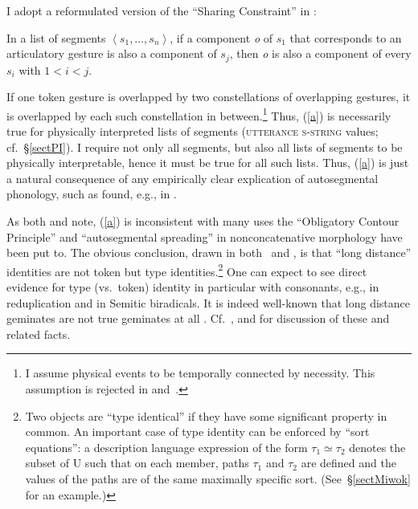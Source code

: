 \documentclass[output=paper]{langsci/langscibook}
\begin{document}
I adopt a reformulated version of the ``Sharing Constraint'' in \cite[93,
(3.13)]{scob:97}:
\begin{exe}
\ex
\label{a} In a list of segments $\left\langle s_1, \ldots,
    s_n \right\rangle$, if a component \textit{o}\/ of $s_1$ that corresponds
  to an articulatory gesture is also a component of $s_j$, then \textit{o}  is also a component of every $s_i$\/ with $1 < i < j$.
\end{exe}
%
If one token gesture is overlapped by two constellations of overlapping
gestures, it is overlapped by each such constellation in
between.\footnote{%
I assume physical events to be
  temporally connected by nec\-essity. This assumption is rejected
  in \cite[41]{bir:kle:90}
  and~\cite[73]{bird:95}.%
}
Thus, (\ref{a}) is necessarily true for
physically interpreted lists of segments (\textsc{utterance s-string} values;
cf.\ \S\ref{sectPI}).  I require not only all segments, but also all lists
of segments to be physically interpretable, hence it must be true for all
such lists. Thus, (\ref{a}) is just a natural consequence of any
empirically clear explication of autosegmental phonology, such as found,
e.g., in \cite{sage:88}.

As both \cite{sage:88} and
\cite{scob:97} note, (\ref{a}) is inconsistent with
many uses the ``Obligatory Contour Principle'' and ``autosegmental
spreading'' in nonconcatenative morphology have been put to. The obvious
conclusion, drawn in both~\cite[115\hspace{1pt}f.\@]{sage:88} and
\cite[223\hspace{1pt}ff.\@]{scob:97}, is that ``long distance''
identities are not token but type identities.\footnote{%
	Two objects are
  ``type identical'' if they have some significant property in common.
 An important case of type identity can be enforced by ``sort equations'': a
  description language expression of the form $\tau_1 \simeq \tau_2$
  denotes the subset of U such that on each member, paths $\tau_1$ and
  $\tau_2$ are defined and the values of the paths are of the same
  maximally specific sort.  (See~\S\ref{sectMiwok} for an example.)%
}
One can expect to see direct evidence for type (vs.\ token) identity in
particular with consonants, e.g., in reduplication and in Semitic
biradicals. It is indeed well-known that long distance geminates are not
true geminates at all%
. Cf.\ \cite[Chapter~6]{scob:97}, and \cite{gafo:98} for
discussion of these and related facts.
\end{document}
